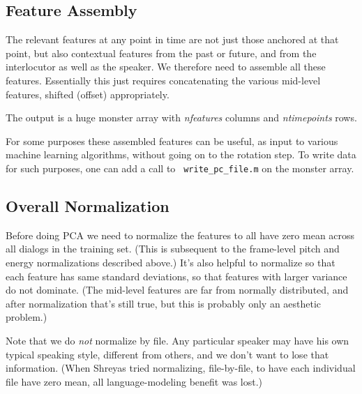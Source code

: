 \documentclass[11pt]{article}
\begin{document}
\subsection{Feature Assembly}

The relevant features at any point in time are not just those anchored
at that point, but also contextual features from the past or future,
and from the interlocutor as well as the speaker.  We therefore need
to assemble all these features.  Essentially this just requires
concatenating the various mid-level features, shifted (offset)
appropriately.

The output is a huge monster array with {\it nfeatures} columns and
{\it ntimepoints} rows.

For some purposes these assembled features can be useful, as input to
various machine learning algorithms, without going on to the rotation
step.  To write data for such purposes, one can add a call to {\tt
  write\_pc\_file.m} on the monster array.


\subsection{Overall Normalization}

Before doing PCA we need to normalize the features to all have zero
mean across all dialogs in the training set.  (This is subsequent to
the frame-level pitch and energy normalizations described above.)
It's also helpful to normalize so that each feature has same standard
deviations, so that features with larger variance do not dominate.
(The mid-level features are far from normally distributed, and after
normalization that's still true, but this is probably only an
aesthetic problem.)


Note that we do {\em not} normalize by file.  Any particular speaker
may have his own typical speaking style, different from others, and we
don't want to lose that information.  (When Shreyas tried normalizing,
file-by-file, to have each individual file have zero mean, all
language-modeling benefit was lost.)
\end{document}
